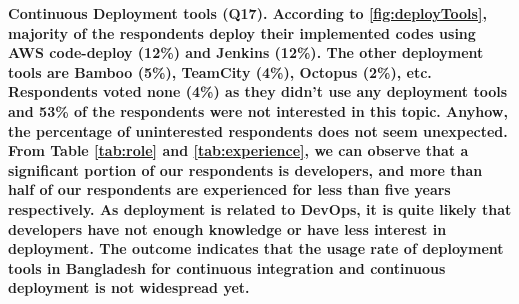 \bf{Continuous Deployment tools (Q17).} According to \ref{fig:deployTools},
majority of the respondents deploy their implemented codes using AWS code-deploy
(12\%) and Jenkins (12\%). The other deployment tools are Bamboo (5\%), TeamCity
(4\%), Octopus (2\%), etc. Respondents voted none (4\%) as they didn't use any
deployment tools and 53\% of the respondents were not interested in this topic.
Anyhow, the percentage of uninterested respondents does not seem unexpected.
From Table \ref{tab:role} and \ref{tab:experience}, we can observe that a
significant portion of our respondents is developers, and more than half of our
respondents are experienced for less than five years respectively. As deployment
is related to DevOps, it is quite likely that developers have not enough
knowledge or have less interest in deployment. 
The outcome indicates that the usage rate of
deployment tools in Bangladesh for continuous integration and continuous
deployment is not widespread yet. 

